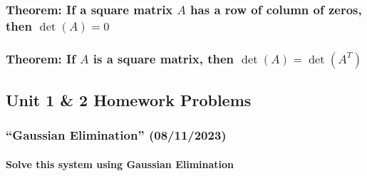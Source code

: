 \documentclass[
  letterpaper,
  DIV=11,
  numbers=noendperiod]{scrartcl}
\let\oldparagraph\paragraph
\renewcommand{\paragraph}[1]{\oldparagraph{#1}\mbox{}}
\begin{document}
\subsubsection{\texorpdfstring{Theorem: If a square matrix \(A\) has a
row of column of zeros, then
\(\det(A) = 0\)}{Theorem: If a square matrix A has a row of column of zeros, then \textbackslash det(A) = 0}}\label{theorem-if-a-square-matrix-a-has-a-row-of-column-of-zeros-then-deta-0}

\subsubsection{\texorpdfstring{Theorem: If \(A\) is a square matrix,
then
\(\det(A) = \det(A^T)\)}{Theorem: If A is a square matrix, then \textbackslash det(A) = \textbackslash det(A\^{}T)}}\label{theorem-if-a-is-a-square-matrix-then-deta-detat}

\newpage{}

\subsection{Unit 1 \& 2 Homework
Problems}\label{unit-1-2-homework-problems}

\subsubsection{``Gaussian Elimination''
(08/11/2023)}\label{gaussian-elimination-08112023}

\paragraph{Solve this system using Gaussian
Elimination}\label{solve-this-system-using-gaussian-elimination}

\end{document}
